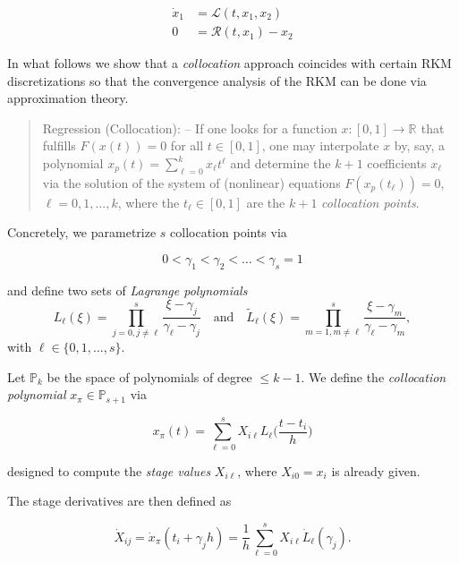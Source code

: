 \documentclass[]{book}
\theoremstyle{definition}
\theoremstyle{definition}
\theoremstyle{definition}
\theoremstyle{remark}
\begin{document}
\begin{align*}
  \dot x_1  &= \mathcal L(t,x_1,x_2) \\
   0 &= \mathcal R(t,x_1) -x_2
\end{align*}

In what follows we show that a \emph{collocation} approach coincides
with certain RKM discretizations so that the convergence analysis of the
RKM can be done via approximation theory.

\begin{quote}
Regression (Collocation): -- If one looks for a function
\(x\colon [0,1] \to \mathbb R^{}\) that fulfills \(F(x(t))=0\) for all
\(t\in[0,1]\), one may interpolate \(x\) by, say, a polynomial
\(x_p(t) = \sum_{\ell=0}^kx_\ell t^\ell\) and determine the \(k+1\)
coefficients \(x_\ell\) via the solution of the system of (nonlinear)
equations \(F(x_p(t_\ell))=0\), \(\ell=0,1,\dotsc,k\), where the
\(t_\ell\in[0,1]\) are the \(k+1\) \emph{collocation points}.
\end{quote}

Concretely, we parametrize \(s\) collocation points via

\begin{equation}
0< \gamma_1 <\gamma_2< \dotsc < \gamma_s=1 \label{eq:rkm-collo-gamma}
\end{equation}

and define two sets of \emph{Lagrange polynomials} \[
L_\ell(\xi) = \prod_{j=0,j\neq \ell}^s \frac{\xi-\gamma_j}{\gamma_\ell-\gamma_j}
\quad\text{and}\quad
\tilde L_\ell(\xi) = \prod_{m=1,m\neq \ell}^s \frac{\xi-\gamma_m}{\gamma_\ell-\gamma_m},
\] with \(\ell\in\{0,1,\dotsc,s\}\).

Let \(\mathbb P_k\) be the space of polynomials of degree \(\leq k-1\).
We define the \emph{collocation polynomial}
\(x_\pi \in \mathbb P_{s+1}\) via

\begin{equation}
x_\pi (t) = \sum_{\ell=0}^s X_{i\ell}L_\ell\bigl(\frac{t-t_i}{h}\bigr)
\label{eq:rkm-coll-collpol}
\end{equation}

designed to compute the \emph{stage values} \(X_{i\ell}\), where
\(X_{i0}=x_i\) is already given.

The stage derivatives are then defined as

\begin{equation}
\dot X_{ij} = \dot x_\pi(t_i+\gamma_jh) = \frac 1h \sum_{\ell=0}^sX_{i\ell}\dot L_\ell(\gamma_j). \label{eq:rkm-coll-staged}
\end{equation}
\end{document}
